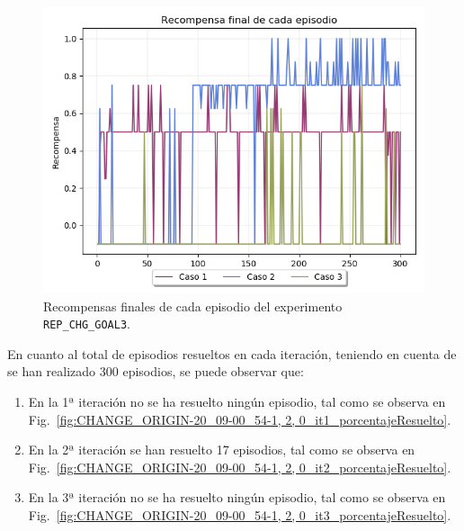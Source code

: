 \begin{figure}
    \centering
    \includegraphics[scale=0.4]{cap5_experimentacion/images/CHANGE_GOAL-20_09-21_47-1, 2, 0_recompensa.png}
    \caption{Recompensas finales de cada episodio del experimento \texttt{REP\_CHG\_GOAL3}.}
    \label{fig:CHANGE_GOAL-20_09-21_47-1, 2, 0_recompensa}
\end{figure}

En cuanto al total de episodios resueltos en cada iteración, teniendo en cuenta de se han realizado 300 episodios, se puede observar que: 
\begin{enumerate}
    \item En la 1ª iteración no se ha resuelto ningún episodio, tal como se observa en Fig.~\ref{fig:CHANGE_ORIGIN-20_09-00_54-1, 2, 0_it1_porcentajeResuelto}.
    \item En la 2ª iteración se han resuelto 17 episodios, tal como se observa en Fig.~\ref{fig:CHANGE_ORIGIN-20_09-00_54-1, 2, 0_it2_porcentajeResuelto}.
    \item En la 3ª iteración no se ha resuelto ningún episodio, tal como se observa en Fig.~\ref{fig:CHANGE_ORIGIN-20_09-00_54-1, 2, 0_it3_porcentajeResuelto}.
\end{enumerate}

